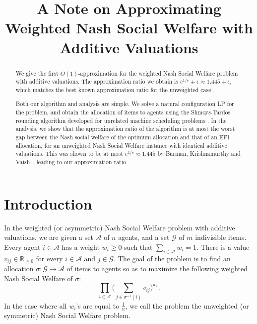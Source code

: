 \documentclass{theoretics}
\title{A Note on Approximating Weighted Nash Social Welfare with Additive Valuations}
\newcommand\calA{{\mathcal{A}}}
\newcommand\calG{{\mathcal{G}}}
\newcommand{\R}{{\mathbb{R}}}
\begin{document}
\maketitle

\begin{abstract}
    We give the first $O(1)$-approximation for the weighted Nash Social Welfare problem with additive valuations. The approximation ratio we obtain is $e^{1/e} + \epsilon \approx 1.445 + \epsilon$, which matches the best known approximation ratio for the unweighted case \cite{BKV18}.  
    
    Both our algorithm and analysis are simple. We solve a natural configuration LP for the problem, and obtain the allocation of items to agents using the Shmoys-Tardos rounding algorithm developed for  unrelated machine scheduling problems \cite{ST93}. In the analysis, we show that the approximation ratio of the algorithm is at most the worst gap between the Nash social welfare of the optimum allocation and that of an EF1 allocation, for an unweighted Nash Social Welfare instance with identical additive valuations. This was shown to be at most $e^{1/e} \approx 1.445$ by Barman, Krishnamurthy and Vaish\ \cite{BKV18}, leading to our approximation ratio. 
\end{abstract}

 


\section{Introduction}


In the weighted (or asymmetric) Nash Social Welfare problem with additive valuations, we are given a set $\calA$ of $n$ agents, and a set $\calG$ of $m$ indivisible items. Every agent $i \in \calA$ has a weight $w_i \geq 0$ such that $\sum_{i \in \calA}w_i = 1$. There is a value $v_{ij} \in \R_{\geq 0}$ for every $i \in \calA$ and $j \in \calG$.  The goal of the problem is to find an allocation $\sigma: \calG \to \calA$ of items to agents so as to maximize the following weighted Nash Social Welfare of $\sigma$: 
\begin{equation*}
    \prod_{i \in \calA} \bigg(\sum_{j \in \sigma^{-1}(i)}v_{ij}\bigg)^{w_i}.
\end{equation*}
In the case where all $w_i$'s are equal to $\frac1n$, we call the problem the unweighted (or symmetric) Nash Social Welfare problem.
\end{document}
